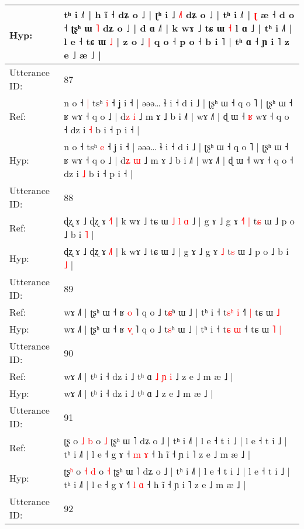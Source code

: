 \documentclass[10pt]{article}
\DeclareRobustCommand{\hl}[1]{{\textcolor{red}{#1}}}
\begin{document}
\begin{longtable}{ll}
 \\
Hyp: & tʰ i ˩˥ | h ĩ ˧ dʑ o ˩ | ʈʰ i ˩\hl{ }\hl{˩}\hl{˥} dʑ o ˩ | tʰ i ˩˥ | \hl{ʈ} æ ˧ d o ˧\hl{}\hl{} ʈʂʰ ɯ \hl{˥} dʑ o ˩ | d ɑ ˩˥ | k wɤ ˩ tɕ ɯ \hl{˧} l ɑ ˩ | tʰ i ˩˥ | l e ˧ tɕ\hl{} ɯ \hl{˩} | z o ˩\hl{ }\hl{|} q o ˧ p o ˧ b i ˥ | tʰ ɑ ˧ ɲ i ˥ z e ˩\hl{}\hl{} æ ˩ |
 \\
\midrule
Utterance ID: & 87 \\
Ref: & n o ˧\hl{ }\hl{|} tsʰ \hl{i} ˧ ʝ i ˧ | əəə… ɬ i ˧ d i ˩ | ʈʂʰ ɯ ˧ q o ˥ | ʈʂʰ ɯ ˧ ʁ wɤ ˧ q o ˩ | d\hl{z} \hl{i} ˩ m ɤ ˩ b i ˩˥ | wɤ ˩˥ | ɖ ɯ ˧\hl{ }\hl{ʁ} wɤ ˧ q o ˧ dz i \hl{˧} b i ˧ p i ˧ |
 \\
Hyp: & n o ˧\hl{}\hl{} tsʰ \hl{e} ˧ ʝ i ˧ | əəə… ɬ i ˧ d i ˩ | ʈʂʰ ɯ ˧ q o ˥ | ʈʂʰ ɯ ˧ ʁ wɤ ˧ q o ˩ | d\hl{ʑ} \hl{ɯ} ˩ m ɤ ˩ b i ˩˥ | wɤ ˩˥ | ɖ ɯ ˧\hl{}\hl{} wɤ ˧ q o ˧ dz i \hl{˩} b i ˧ p i ˧ |
 \\
\midrule
Utterance ID: & 88 \\
Ref: & ɖʐ ɤ ˩ ɖʐ ɤ \hl{˧}˥ | k wɤ ˩ tɕ ɯ\hl{ }\hl{˩}\hl{ }\hl{l}\hl{ }\hl{ɑ} ˩ | g ɤ ˩ g ɤ\hl{ }\hl{˧}\hl{˥} \hl{|} t\hl{ɕ} ɯ ˩ p o ˩ b i \hl{˥} |
 \\
Hyp: & ɖʐ ɤ ˩ ɖʐ ɤ \hl{˩}˥ | k wɤ ˩ tɕ ɯ\hl{}\hl{}\hl{}\hl{}\hl{}\hl{} ˩ | g ɤ ˩ g ɤ\hl{}\hl{}\hl{} \hl{˩} t\hl{s} ɯ ˩ p o ˩ b i \hl{˩} |
 \\
\midrule
Utterance ID: & 89 \\
Ref: & wɤ ˩˥ | ʈʂʰ ɯ ˧ ʁ \hl{}\hl{o} ˥ q o ˩ t\hl{ɕ}ʰ ɯ ˩ | tʰ i ˧ t\hl{s}\hl{ʰ} \hl{i} ˧\hl{˥}\hl{ }\hl{|} tɕ ɯ\hl{}\hl{} \hl{˩}
 \\
Hyp: & wɤ ˩˥ | ʈʂʰ ɯ ˧ ʁ \hl{v}\hl{̩} ˥ q o ˩ t\hl{s}ʰ ɯ ˩ | tʰ i ˧ t\hl{}\hl{ɕ} \hl{ɯ} ˧\hl{}\hl{}\hl{} tɕ ɯ\hl{ }\hl{˥} \hl{|}
 \\
\midrule
Utterance ID: & 90 \\
Ref: & wɤ ˩˥ | tʰ i ˧ dz i ˩ tʰ ɑ\hl{ }\hl{˩}\hl{ }\hl{ɲ}\hl{ }\hl{i} ˩ z e ˩ m æ ˩ |
 \\
Hyp: & wɤ ˩˥ | tʰ i ˧ dz i ˩ tʰ ɑ\hl{}\hl{}\hl{}\hl{}\hl{}\hl{} ˩ z e ˩ m æ ˩ |
 \\
\midrule
Utterance ID: & 91 \\
Ref: & ʈʂ\hl{} o \hl{˩} \hl{b} o \hl{˩} ʈʂʰ ɯ ˥ dʑ o ˩ | tʰ i ˩˥ | l e ˧ t i ˩ | l e ˧ t i ˩ | tʰ i ˩˥ | l e ˧ g ɤ ˧\hl{} \hl{m} \hl{ɤ} ˧ h ĩ ˧ ɲ i ˥ z e ˩ m æ ˩ |
 \\
Hyp: & ʈʂ\hl{ʰ} o \hl{˧} \hl{d} o \hl{˧} ʈʂʰ ɯ ˥ dʑ o ˩ | tʰ i ˩˥ | l e ˧ t i ˩ | l e ˧ t i ˩ | tʰ i ˩˥ | l e ˧ g ɤ ˧\hl{˥} \hl{l} \hl{ɑ} ˧ h ĩ ˧ ɲ i ˥ z e ˩ m æ ˩ |
 \\
\midrule
Utterance ID: & 92 \\

\end{longtable}
\end{document}
